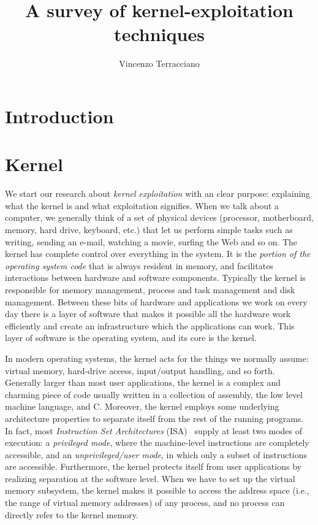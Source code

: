 \documentclass{masterthesis}
\begin{document}
\title{A survey of kernel-exploitation techniques}

\author{Vincenzo Terracciano}


\examiner{_______ ______}

\maketitle

\tableofcontents

\chapter{Introduction}

\chapter{Kernel}
\label{ch:kernel}

We start our research about \emph{kernel exploitation} with an clear purpose: explaining what the kernel is and what exploitation signifies.
When we talk about a computer, we generally think of a set of physical devices (processor, motherboard, memory, hard drive, keyboard, etc.) that let us  perform simple tasks such as writing, sending an e-mail, watching a movie, surfing the Web and so on.
The kernel has complete control over everything in the system. It is the \emph{portion of the operating system code} that is always resident in memory, and facilitates interactions between hardware and software components.
Typically the kernel is responsible for memory management, process and task management and disk management.
Between these bits of hardware and applications we work on every day there is a layer of software that makes it possible all the hardware work efficiently and create an infrastructure which the applications can work.
This layer of software is the operating system, and its core is the kernel.

In modern operating systems, the kernel acts for the things we normally assume: virtual memory, hard-drive access, input/output handling, and so forth. Generally larger than most user applications, the kernel is a complex and charming piece of code usually written in a collection of assembly, the low level machine language, and C.
Moreover, the kernel employs some underlying architecture properties to separate itself from the rest of the running programs.
In fact, most \emph{Instruction Set Architectures} (ISA)~\cite{silberman1993architectural} supply at least two modes of execution: a \emph{privileged mode}, where the machine-level instructions are completely accessible, and an \emph{unprivileged/user mode}, in which only a subset of instructions are accessible.
Furthermore, the kernel protects itself from user applications by realizing separation at the software level.
When we have to set up the virtual memory subsystem, the kernel makes it possible to access the address space (i.e., the range of virtual memory addresses) of any process, and no process can directly refer to the kernel memory.
\end{document}
